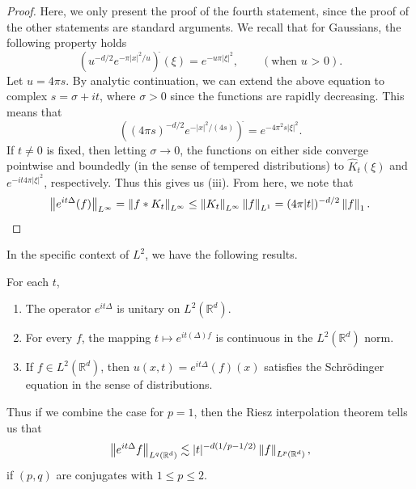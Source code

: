 \documentclass{article}
\begin{document}
\begin{proof}
	Here, we only present the proof of the fourth statement, since the proof of the other statements are standard arguments. We recall that for Gaussians, the following property holds 
	\begin{equation*}
		(u^{-d/2}e^{-\pi|x|^{2}/u})^{\hat{}}(\xi) = e^{-u\pi|\xi|^{2}}, \qquad (\text{when $u$ > 0}). 
	\end{equation*} 
	Let $u = 4\pi s$. By analytic continuation, we can extend the above equation to complex $s = \sigma + it$, where $\sigma > 0$ since the functions are rapidly decreasing. This means that 
	\begin{equation*}
		((4\pi s)^{-d/2}e^{-|x|^{2}/(4s)})^{\hat{}} = e^{-4\pi^{2}s|\xi|^{2}}. 
	\end{equation*} 
	If $t \neq 0$ is fixed, then letting $\sigma \to 0$, the functions on either side converge pointwise and boundedly (in the sense of tempered distributions) to $\hat{K}_{t}(\xi)$ and $e^{-it4\pi|\xi|^{2}}$, respectively. Thus this gives us (iii). From here, we note that 
	\begin{equation*}
		\left\Vert e^{it\Delta}(f) \right\Vert_{L^{\infty}} = \left\Vert f \ast K_{t} \right\Vert_{L^{\infty}} \leq \left\Vert K_{t} \right\Vert_{L^{\infty}}\left\Vert f \right\Vert_{L^{1}} = (4\pi |t|)^{-d/2}\left\Vert f \right\Vert_{1}. 
	\end{equation*}
\end{proof} 
In the specific context of $L^{2}$, we have the following results. 
\begin{prop}
	For each $t$, \vspace{-0.25cm}
	\begin{enumerate}[itemsep =-2pt,label = (\roman{*})]
		\item The operator $e^{it\Delta}$ is unitary on $L^{2}(\mathbb{R}^{d})$. 
		\item For every $f$, the mapping $t \mapsto e^{it(\Delta)f}$ is continuous in the $L^{2}(\mathbb{R}^{d})$ norm. 
		\item If $f \in L^{2}(\mathbb{R}^{d})$, then $u(x, t) = e^{it\Delta}(f)(x)$ satisfies the Schr\"odinger equation in the sense of distributions. 
	\end{enumerate}
\end{prop} 
Thus if we combine the case for $p = 1$, then the Riesz interpolation theorem tells us that 
\begin{equation*}
	\left\Vert e^{it\Delta}f \right\Vert_{L^{q}(\mathbb{R}^{d})} \lesssim |t|^{-d(1/p - 1/2)}\left\Vert f \right\Vert_{L^{p}(\mathbb{R}^{d})}, 
\end{equation*}
if $(p,q)$ are conjugates with $1 \leq p \leq 2$.
\end{document}
